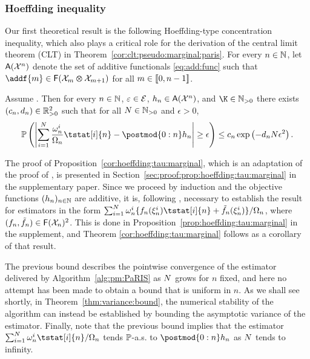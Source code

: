 
\subsubsection*{Hoeffding inequality}

Our first theoretical result is the following Hoeffding-type concentration inequality, which also plays a critical role for the derivation of the central limit theorem (CLT) in Theorem~\ref{cor:clt:pseudo:marginal:paris}. For every $n \in \mathbb{N}$, let $\mathsf{A}(\mathcal{X}^n)$ denote the set of additive functionals \eqref{eq:add:func} such that $\addf{m} \in \bmf{\Xfd_m \tensprod \Xfd_{m + 1}}$ for all $m \in \llbracket 0, n - 1 \rrbracket$.   
\begin{theorem}
\label{cor:hoeffding:tau:marginal}
Assume . Then for every $n \in \mathbb{N}$, $\varepsilon \in \mathcal{E}$, $h_n \in \mathsf{A}(\mathcal{X}^n)$, and $\K \in \nsetpos$ there exists $(c_n, d_n) \in \mathbb{R}_{> 0}^2$ such that for all $N \in \mathbb{N}_{> 0}$ and $\epsilon > 0$,
$$
\pP\left(\left| \sum_{i = 1}^\N \frac{\ewght{n}{i}}{\sumwght{n}} \tstat[i]{n} - \postmod{0:n} h_n \right| \geq \epsilon \right) \leq c_n \exp \left( - d_n \N \epsilon^2 \right).
$$
\end{theorem}

The proof of Proposition~\ref{cor:hoeffding:tau:marginal}, which is an adaptation of the proof of \cite[Theorem~1]{olsson:westerborn:2014b}, is presented in Section~\ref{sec:proof:prop:hoeffding:tau:marginal} in the supplementary paper. Since we proceed by induction and the objective functions $(h_n)_{n \in \mathbb{N}}$ are additive, it is, following \cite{olsson:westerborn:2014b}, necessary to establish the result for estimators in the form $\sum_{i = 1}^\N \ewght{n}{i} \{ f_n(\epart{n}{i}) \tstat[i]{n} + \ftd{n}(\epart{n}{i}) \} / \sumwght{n}$, where $(f_n, \tilde{f}_{n}) \in \mathsf{F}(\mathcal{X}_n)^2$. This is done in Proposition~\ref{prop:hoeffding:tau:marginal} in the supplement, and Theorem \ref{cor:hoeffding:tau:marginal} follows as a corollary of that result. 

The previous bound describes the pointwise convergence of the estimator delivered by Algorithm~\ref{alg:pm:PaRIS} as $N$ grows for $n$ fixed, and here no attempt has been made to obtain a bound that is uniform in $n$. As we shall see shortly, in Theorem~\ref{thm:variance:bound}, the numerical stability of the algorithm can instead be established by bounding the asymptotic variance of the estimator. Finally, note that the previous bound implies that the estimator $\sum_{i = 1}^\N \ewght{n}{i} \tstat[i]{n} / \sumwght{n}$ tends $\mathbb{P}$-a.s. to $\postmod{0:n} h_n$ as $N$ tends to infinity. 


